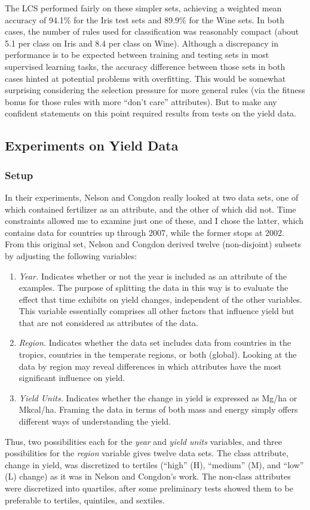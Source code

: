 \documentclass[12pt]{article}
\begin{document}
The LCS performed fairly on these simpler sets, achieving a weighted mean accuracy of 94.1\% for the Iris test sets and 89.9\% for the Wine sets. In both cases, the number of rules used for classification was reasonably compact (about 5.1 per class on Iris and 8.4 per class on Wine). Although a discrepancy in performance is to be expected between training and testing sets in most supervised learning tasks, the accuracy difference between those sets in both cases hinted at potential problems with overfitting. This would be somewhat surprising considering the selection pressure  for more general rules (via the fitness bonus for those rules with more ``don't care'' attributes). But to make any confident statements on this point required results from tests on the yield data.

\subsection{Experiments on Yield Data}

\subsubsection{Setup}
In their experiments, Nelson and Congdon really looked at two data sets, one of which contained fertilizer as an attribute, and the other of which did not. Time constraints allowed me to examine just one of these, and I chose the latter, which contains data for countries up through 2007, while the former stops at 2002. From this original set, Nelson and Congdon derived twelve (non-disjoint) subsets by adjusting the following variables:
\begin{enumerate}
\item \textit{Year.} Indicates whether or not the year is included as an attribute of the examples. The purpose of splitting the data in this way is to evaluate the effect that time exhibits on yield changes, independent of the other variables. This variable essentially comprises all other factors that influence yield but that are not considered as attributes of the data.
\item \textit{Region.} Indicates whether the data set includes data from countries in the tropics, countries in the temperate regions, or both (global). Looking at the data by region may reveal differences in which attributes have the most significant influence on yield.
\item \textit{Yield Units.} Indicates whether the change in yield is expressed as Mg/ha or Mkcal/ha. Framing the data in terms of both mass and energy simply offers different ways of understanding the yield.
\end{enumerate}
Thus, two possibilities  each for the \textit{year} and \textit{yield units} variables, and three possibilities for the \textit{region} variable gives twelve data sets. The class attribute, change in yield, was discretized to tertiles (``high'' (H), ``medium'' (M), and ``low'' (L) change) as it was in Nelson and Congdon's work. The non-class attributes were discretized into quartiles, after some preliminary tests showed them to be preferable to tertiles, quintiles, and sextiles.
\end{document}

